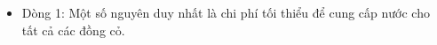 \begin{itemize}
	\item     Dòng 1: Một số nguyên duy nhất là chi phí tối thiểu         để cung cấp nước cho tất cả các đồng cỏ.   
\end{itemize}